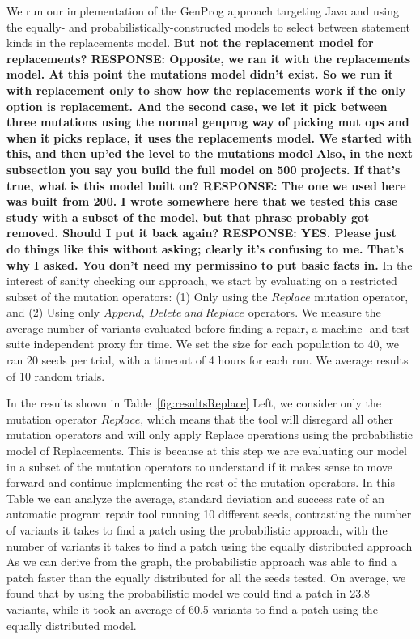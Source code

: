 \documentclass[conference]{IEEEtran}
\newcommand{\todo}[1]
  {{\scriptsize \textbf{\color{red} {#1}}}}
\begin{document}
We run our implementation of the GenProg approach targeting Java and using the
equally- and probabilistically-constructed models to select between statement kinds in the replacements model. \todo{But not the replacement model for replacements? RESPONSE: Opposite, we ran it with the replacements model. At this point the mutations model didn't exist. So we run it with replacement only to show how the replacements work if the only option is replacement. And the second case, we let it pick between three mutations using the normal genprog way of picking mut ops and when it picks replace, it uses the replacements model. We started with this, and then up'ed the level to the mutations model}\todo{Also, in
  the next subsection you say you build the full model on 500 projects.  If
  that's true, what is this model built on? RESPONSE: The one we used here was built from 200. I wrote somewhere here that we tested this case study with a subset of the model, but that phrase probably got removed. Should I put it back again? RESPONSE: YES.  Please just do things like this without asking; clearly it's confusing to me.  That's why I asked.  You don't need my permissino to put basic facts in.}
In the interest of sanity checking our approach, we 
start by evaluating on a restricted subset of 
the mutation operators: (1) Only using the $Replace$ mutation operator, and (2) Using only $Append,~
Delete~and~Replace$ operators.  We measure the average number of variants
evaluated before finding a repair, a machine- and test-suite independent proxy
for time. We set the size for each population to 40, we ran 20
seeds per trial, with a timeout of 4 hours for each run.  We average results of 10 random trials.

In the results shown in Table~\ref{fig:resultsReplace} Left, we consider only the mutation operator 
$Replace$, which means that the tool will disregard all other mutation 
operators and will only apply Replace operations using the probabilistic model 
of Replacements. This is because at this step we are evaluating our model in a 
subset of the mutation operators to understand if it makes sense to move forward and 
continue implementing the rest of the mutation operators.
%
In this Table we can analyze the average, standard deviation and success rate of an automatic program repair tool running 10 different seeds, contrasting the 
number of variants it takes to find a patch using the probabilistic approach, with the number of variants it takes to find a patch using the 
equally distributed approach 
%
As we can derive from the graph, the probabilistic approach was able to find a 
patch faster than the equally distributed for all the seeds tested. On average,
we found that by using the probabilistic model we  
could find a patch in 23.8 variants, while it took an average of 60.5 variants 
to find a patch using the equally distributed model.
\end{document}
